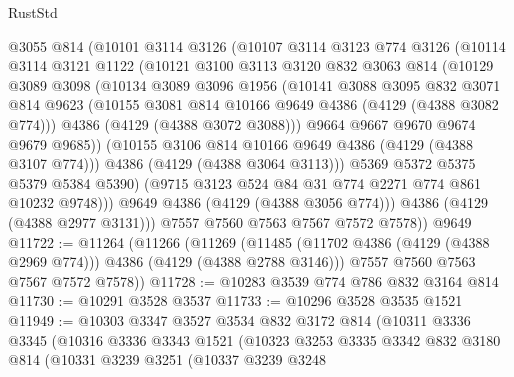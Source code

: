 \begin{lexlean}{RustStd}
\begin{coremodule}
            @3055
            @814
            (@10101
              @3114
              @3126
              (@10107
                @3114
                @3123
                @774
                @3126
                (@10114
                  @3114
                  @3121
                  @1122
                  (@10121
                    @3100
                    @3113
                    @3120
                    @832
                    @3063
                    @814
                    (@10129
                      @3089
                      @3098
                      (@10134
                        @3089
                        @3096
                        @1956
                        (@10141
                          @3088
                          @3095
                          @832
                          @3071
                          @814
                          @9623
                          (@10155 @3081 @814 @10166 @9649 @4386 (@4129 (@4388 @3082 @774)))
                          @4386
                          (@4129 (@4388 @3072 @3088)))
                        @9664
                        @9667
                        @9670
                        @9674
                        @9679
                        @9685))
                    (@10155 @3106 @814 @10166 @9649 @4386 (@4129 (@4388 @3107 @774)))
                    @4386
                    (@4129 (@4388 @3064 @3113)))
                  @5369
                  @5372
                  @5375
                  @5379
                  @5384
                  @5390)
                (@9715 @3123 @524 @84 @31 @774 @2271 @774 @861 @10232 @9748)))
            @9649
            @4386
            (@4129 (@4388 @3056 @774)))
          @4386
          (@4129 (@4388 @2977 @3131)))
        @7557
        @7560
        @7563
        @7567
        @7572
        @7578))
    @9649
@11722 := @11264
    (@11266
      (@11269
        (@11485 (@11702 @4386 (@4129 (@4388 @2969 @774))) @4386 (@4129 (@4388 @2788 @3146)))
        @7557
        @7560
        @7563
        @7567
        @7572
        @7578))
@11728 := @10283 @3539 @774 @786 @832 @3164 @814
@11730 := @10291 @3528 @3537
@11733 := @10296 @3528 @3535 @1521
@11949 := @10303
    @3347
    @3527
    @3534
    @832
    @3172
    @814
    (@10311
      @3336
      @3345
      (@10316
        @3336
        @3343
        @1521
        (@10323
          @3253
          @3335
          @3342
          @832
          @3180
          @814
          (@10331
            @3239
            @3251
            (@10337
              @3239
              @3248

\end{coremodule}
\end{lexlean}
